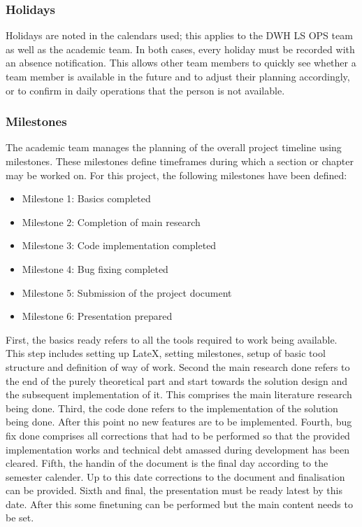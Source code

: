 \subsubsection*{Holidays}
Holidays are noted in the calendars used; this applies to the DWH LS OPS team as well as the academic team. In both cases, every holiday must be recorded with an absence notification. This allows other team members to quickly see whether a team member is available in the future and to adjust their planning accordingly, or to confirm in daily operations that the person is not available.

\subsubsection*{Milestones}
The academic team manages the planning of the overall project timeline using milestones. These milestones define timeframes during which a section or chapter may be worked on. For this project, the following milestones have been defined:

\begin{itemize}
    \item Milestone 1: Basics completed
    \item Milestone 2: Completion of main research
    \item Milestone 3: Code implementation completed
    \item Milestone 4: Bug fixing completed
    \item Milestone 5: Submission of the project document
    \item Milestone 6: Presentation prepared
\end{itemize}

First, the basics ready refers to all the tools required to work being available. This step includes setting up LateX, setting milestones, setup of basic tool structure and definition of way of work. Second the main research done refers to the end of the purely theoretical part and start towards the solution design and the subsequent implementation of it. This comprises the main literature research being done. Third, the code done refers to the implementation of the solution being done. After this point no new features are to be implemented. Fourth, bug fix done comprises all corrections that had to be performed so that the provided implementation works and technical debt amassed during development has been cleared. Fifth, the handin of the document is the final day according to the semester calender. Up to this date corrections to the document and finalisation can be provided. Sixth and final, the presentation must be ready latest by this date. After this some finetuning can be performed but the main content needs to be set.

